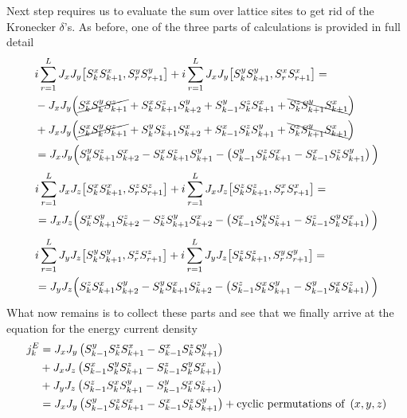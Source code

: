 Next step requires us to evaluate the sum over lattice sites to get rid of the Kronecker \(\delta{}\)'s. As before, one of the three parts of calculations is provided in full detail
\begin{align*}
    &i\sum_{r=1}^{L}  J_{x} J_{y}\comm{\Sx_{k}\Sx_{k+1}}{\Sy_{r}\Sy_{r+1}} + i\sum_{r=1}^{L} J_{x} J_{y}\comm{\Sy_{k}\Sy_{k+1}}{\Sx_{r}\Sx_{r+1}} = \\
    & - J_x J_y \Big( \cancel{\Sx_k \Sy_k \Sz_{k+1}} +  \Sx_k \Sz_{k+1} \Sy_{k+2} + \Sy_{k-1} \Sz_k \Sx_{k+1} +\bcancel{\Sz_k \Sy_{k+1} \Sx_{k+1}}\Big)\\
    &+  J_x J_y \Big(  \cancel{\Sx_k \Sy_k \Sz_{k+1}} + \Sy_k \Sz_{k+1} \Sx_{k+2} + \Sx_{k-1} \Sz_k \Sy_{k+1} + \bcancel{\Sz_k \Sy_{k+1} \Sx_{k+1}}\Big)\\
    &= J_x J_y \Big( \Sy_k \Sz_{k+1} \Sx_{k+2} - \Sx_k \Sz_{k+1} \Sy_{k+1} - \left(\Sy_{k-1}\Sz_k \Sx_{k+1} - \Sx_{k-1}\Sz_{k}\Sy_{k+1}\right) \Big)
\end{align*}
\begin{align*}
    &i\sum_{r=1}^{L}  J_{x} J_{z}\comm{\Sx_{k}\Sx_{k+1}}{\Sz_{r}\Sz_{r+1}} + i\sum_{r=1}^{L} J_{x} J_{z}\comm{\Sz_{k}\Sz_{k+1}}{\Sx_{r}\Sx_{r+1}} = \\
    &= J_x J_z \Big( \Sx_k \Sy_{k+1} \Sz_{k+2} - \Sz_k \Sy_{k+1} \Sx_{k+2} - \left(\Sx_{k-1}\Sy_k \Sz_{k+1} - \Sz_{k-1}\Sy_{k}\Sx_{k+1}\right) \Big)
\end{align*}
\begin{align*}    
    &i\sum_{r=1}^{L}  J_{y} J_{z}\comm{\Sy_{k}\Sy_{k+1}}{\Sz_{r}\Sz_{r+1}} + i\sum_{r=1}^{L} J_{y} J_{z}\comm{\Sz_{k}\Sz_{k+1}}{\Sy_{r}\Sy_{r+1}} = \\
    &= J_y J_z \Big( \Sz_k \Sx_{k+1} \Sy_{k+2} - \Sy_k \Sx_{k+1} \Sz_{k+2} - \left(\Sz_{k-1}\Sx_k \Sy_{k+1} - \Sy_{k-1}\Sx_{k}\Sz_{k+1}\right) \Big)
\end{align*}
What now remains is to collect these parts and see that we finally arrive at the equation for the energy current density
\begin{align}
    j_k^E &= J_x J_y \left(S^{y}_{k-1}S^{z}_k S^{x}_{k+1} - S^{x}_{k-1}S^{z}_{k}S^{y}_{k+1}\right) \nonumber \\
    &+ J_x J_z \left(S^{x}_{k-1}S^{y}_k S^{z}_{k+1} - S^{z}_{k-1}S^{y}_{k}S^{x}_{k+1}\right) \nonumber \\
    &+ J_y J_z \left(S^{z}_{k-1}S^{x}_k S^{y}_{k+1} - S^{y}_{k-1}S^{x}_{k}S^{z}_{k+1}\right) \nonumber \\
    &= J_x J_y \left(S^{y}_{k-1}S^{z}_k S^{x}_{k+1} - S^{x}_{k-1}S^{z}_{k}S^{y}_{k+1}\right) + \text{cyclic permutations of } \left(x,y,z\right)
    \label{eq:energy current density}
\end{align}
